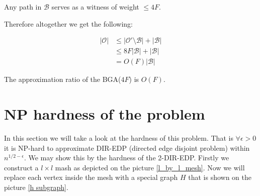 \begin{observ}
	Any path in $\mathcal{B}$ serves as a witness of weight $\leq 4F$.
\end{observ}

Therefore altogether we get the following:

$$
\begin{aligned}
	|\mathcal{O}| &\leq |\mathcal{O}' \setminus \mathcal{B}| + |\mathcal{B}| \\
	 &\leq 8F |\mathcal{B}| + |\mathcal{B}| \\
	 & = O(F) |\mathcal{B}|
\end{aligned}
$$

\begin{thm}
	The approximation ratio of the BGA($4F$) is $O(F)$.
\end{thm}

\section{NP hardness of the problem}


In this section we will take a look at the hardness of this problem. That is $\forall \epsilon > 0$ it is NP-hard to approximate DIR-EDP (directed edge disjoint problem) within $n^{1/2 - \epsilon}$. We may show this by the hardness of the 2-DIR-EDP. Firstly we construct a $l \times l$ mash as depicted on the picture \ref{l_by_l_mesh}. Now we will replace each vertex inside the mesh with a special graph $H$ that is shown on the picture \ref{h subgraph}.

